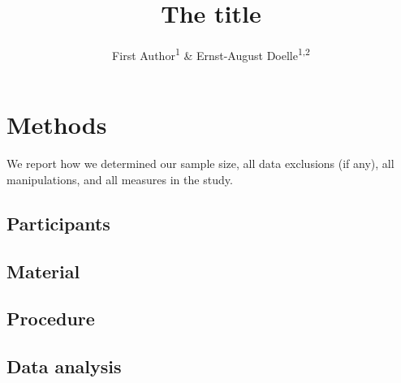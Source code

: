 \documentclass[
  man]{apa6}
\title{The title}
\author{First Author\textsuperscript{1} \& Ernst-August Doelle\textsuperscript{1,2}}
\date{}
\affiliation{\vspace{0.5cm}\textsuperscript{1} Wilhelm-Wundt-University\\\textsuperscript{2} Konstanz Business School}
\begin{document}
\maketitle

\hypertarget{methods}{%
\section{Methods}\label{methods}}

We report how we determined our sample size, all data exclusions (if any), all manipulations, and all measures in the study.

\hypertarget{participants}{%
\subsection{Participants}\label{participants}}

\hypertarget{material}{%
\subsection{Material}\label{material}}

\hypertarget{procedure}{%
\subsection{Procedure}\label{procedure}}

\hypertarget{data-analysis}{%
\subsection{Data analysis}\label{data-analysis}}
\end{document}
